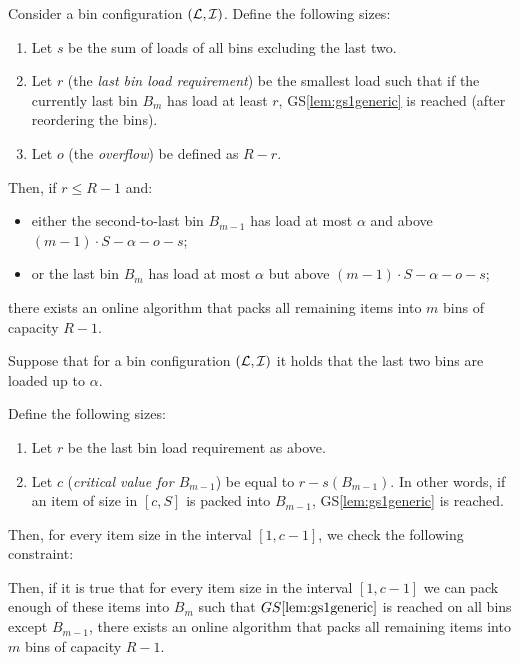 
\begin{goodsit}\label{lem:gs3generic}
Consider a bin configuration $({\mathcal L},{\mathcal I})$. Define the following
sizes:

\begin{enumerate}
\item Let $s$ be the sum of loads of all bins excluding the last two.
\item Let $r$ (the \emph{last bin load requirement}) be
the smallest load such that if the currently last bin $B_m$ has load at least $r$,
GS\ref{lem:gs1generic} is reached (after reordering the bins).
\item Let $o$ (the \emph{overflow}) be defined as $R-r$.
\end{enumerate}

Then, if $r \le R-1$ and:

\begin{itemize}
\item either the second-to-last bin $B_{m-1}$ has load at most $\alpha$
and above $(m-1)\cdot S - \alpha - o - s$;
\item or the last bin $B_m$ has load at most $\alpha$
but above $(m-1)\cdot S - \alpha - o - s$;
\end{itemize}

there exists an online algorithm that packs all remaining items into
$m$ bins of capacity $R-1$.
\end{goodsit}

\begin{goodsit}\label{lem:gs4generic}

Suppose that for a bin configuration $({\mathcal L}, {\mathcal I})$ it holds that
the last two bins are loaded up to $\alpha$. 

Define the following sizes:

\begin{enumerate}
\item Let $r$ be the last bin load requirement as above.
\item Let $c$ (\emph{critical value for $B_{m-1}$}) be equal to $r - s(B_{m-1})$.
In other words, if an item of size in $[c,S]$ is packed into $B_{m-1}$, GS\ref{lem:gs1generic}
is reached.
\end{enumerate}

Then, for every item size in the interval $[1,c-1]$, we check the following
constraint:

Then, if it is true that for every item size in the interval $[1,c-1]$
we can pack enough of these items into $B_{m}$ such that
$GS\ref{lem:gs1generic}$ is reached on all bins except $B_{m-1}$,
there exists an online algorithm that packs all remaining items into
$m$ bins of capacity $R-1$.

\end{goodsit}

